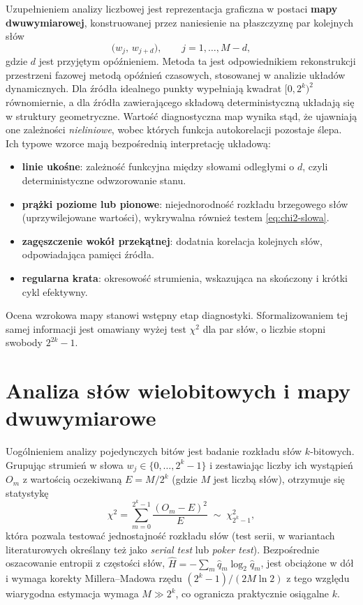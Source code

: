 Uzupełnieniem analizy liczbowej jest reprezentacja graficzna w postaci
\textbf{mapy dwuwymiarowej}, konstruowanej przez naniesienie na płaszczyznę
par kolejnych słów
%
\begin{equation}
  \big(w_j,\, w_{j+d}\big), \qquad j = 1,\dots,M-d,
  \label{eq:mapa2d}
\end{equation}
%
gdzie $d$ jest przyjętym opóźnieniem. Metoda ta jest odpowiednikiem
rekonstrukcji przestrzeni fazowej metodą opóźnień czasowych, stosowanej
w analizie układów dynamicznych. Dla źródła idealnego punkty wypełniają
kwadrat $[0,2^k)^2$ równomiernie, a dla źródła zawierającego składową
deterministyczną układają się w struktury geometryczne. Wartość diagnostyczna
map wynika stąd, że ujawniają one zależności \emph{nieliniowe}, wobec których
funkcja autokorelacji pozostaje ślepa. Ich typowe wzorce mają bezpośrednią
interpretację układową:

\begin{itemize}
  \item \textbf{linie ukośne}: zależność funkcyjna między słowami
        odległymi o $d$, czyli deterministyczne odwzorowanie stanu.
  \item \textbf{prążki poziome lub pionowe}: niejednorodność rozkładu
        brzegowego słów (uprzywilejowane wartości), wykrywalna również
        testem \eqref{eq:chi2-slowa}.
  \item \textbf{zagęszczenie wokół przekątnej}: dodatnia korelacja
        kolejnych słów, odpowiadająca pamięci źródła.
  \item \textbf{regularna krata}: okresowość strumienia, wskazująca na
        skończony i krótki cykl efektywny.
\end{itemize}

Ocena wzrokowa mapy stanowi wstępny etap diagnostyki. Sformalizowaniem tej
samej informacji jest omawiany wyżej test $\chi^2$ dla par słów, o liczbie
stopni swobody $2^{2k}-1$.

\section{Analiza słów wielobitowych i mapy dwuwymiarowe}

Uogólnieniem analizy pojedynczych bitów jest badanie rozkładu słów
$k$-bitowych. Grupując strumień w słowa $w_j \in \{0,\dots,2^k-1\}$ i
zestawiając liczby ich wystąpień $O_m$ z wartością oczekiwaną
$E = M/2^k$ (gdzie $M$ jest liczbą słów), otrzymuje się statystykę
%
\begin{equation}
  \chi^2 = \sum_{m=0}^{2^k-1} \frac{(O_m - E)^2}{E}
  \;\sim\; \chi^2_{2^k-1},
  \label{eq:chi2-slowa}
\end{equation}
%
która pozwala testować jednostajność rozkładu słów (test serii, w wariantach
literaturowych określany też jako \emph{serial test} lub \emph{poker test}).
Bezpośrednie oszacowanie entropii z częstości słów, $\hat{H} = -\sum_m
\hat{q}_m \log_2 \hat{q}_m$, jest obciążone w dół i wymaga korekty
Millera--Madowa rzędu $(2^k-1)/(2M\ln 2)$ z tego względu wiarygodna
estymacja wymaga $M \gg 2^k$, co ogranicza praktycznie osiągalne $k$.


